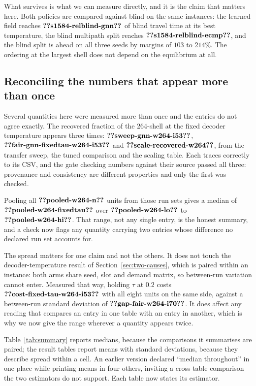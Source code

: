 \documentclass[journal]{IEEEtran}
\begin{document}
What survives is what we can measure directly, and it is the claim that matters here. Both
policies are compared against blind on the same instances: the learned field reaches
$\clm{s1584-relblind-gnn}$ of blind travel time at its best temperature, the blind multipath split reaches
$\clm{s1584-relblind-ecmp}$, and the blind split is ahead on all three seeds by margins of $103$ to $214\%$.
The ordering at the largest shell does not depend on the equilibrium at all.

\subsection{Reconciling the numbers that appear more than once}\label{sec:pooled}
Several quantities here were measured more than once and the entries do not agree exactly. The
recovered fraction of the $264$-shell at the fixed decoder temperature appears three times:
$\clm{sweep-gnn-w264-i53}$, $\clm{fair-gnn-fixedtau-w264-i53}$ and $\clm{scale-recovered-w264}$, from the transfer sweep, the tuned comparison and the scaling table.
Each traces correctly to its CSV, and the gate checking numbers against their source passed all
three: provenance and consistency are different properties and only the first was checked.

Pooling all $\clm{pooled-w264-n}$ units from those run sets gives a median of $\clm{pooled-w264-fixedtau}$ over $\clm{pooled-w264-lo}$ to $\clm{pooled-w264-hi}$. That range, not any single entry, is the honest summary, and a check now flags any quantity carrying two entries whose difference no declared run set accounts for.

The spread matters for one claim and not the others. It does not touch the decoder-temperature result of Section~\ref{sec:two-causes}, which is paired within an instance: both arms share seed, slot and demand matrix, so between-run variation cannot enter. Measured that way, holding $\tau$ at $0.2$ costs $\clm{cost-fixed-tau-w264-i53}$ with all eight units on the same side, against a between-run standard deviation of $\clm{gap-fair-w264-i70}$. It does affect any reading that compares an entry in one table with an entry in another,
which is why we now give the range wherever a quantity appears twice.

Table~\ref{tab:summary} reports medians, because the comparisons it summarises are paired; the
result tables report means with standard deviations, because they describe spread within a cell. An
earlier version declared ``median throughout'' in one place while printing means in four others,
inviting a cross-table comparison the two estimators do not support. Each table now states its
estimator.
\end{document}
